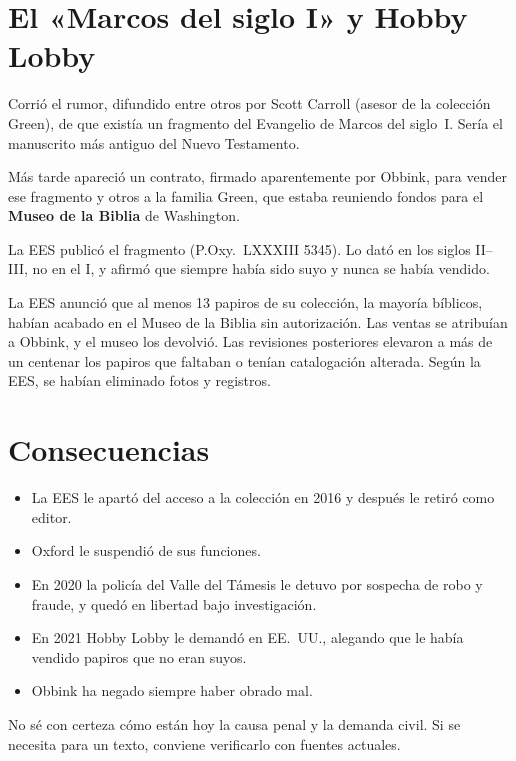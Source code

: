 \documentclass[11pt,a4paper]{article}
\begin{document}
\section*{El «Marcos del siglo I» y Hobby Lobby}

\begin{description}[nosep]
  \item[2012:] Corrió el rumor, difundido entre otros por Scott Carroll (asesor de la colección Green), de que existía un fragmento del Evangelio de Marcos del siglo~I. Sería el manuscrito más antiguo del Nuevo Testamento.
  \item[2013:] Más tarde apareció un contrato, firmado aparentemente por Obbink, para vender ese fragmento y otros a la familia Green, que estaba reuniendo fondos para el \textbf{Museo de la Biblia} de Washington.
  \item[2018:] La EES publicó el fragmento (P.Oxy.\ LXXXIII 5345). Lo dató en los siglos II--III, no en el I, y afirmó que siempre había sido suyo y nunca se había vendido.
  \item[2019:] La EES anunció que al menos 13 papiros de su colección, la mayoría bíblicos, habían acabado en el Museo de la Biblia sin autorización. Las ventas se atribuían a Obbink, y el museo los devolvió. Las revisiones posteriores elevaron a más de un centenar los papiros que faltaban o tenían catalogación alterada. Según la EES, se habían eliminado fotos y registros.
\end{description}

\section*{Consecuencias}

\begin{itemize}[nosep]
  \item La EES le apartó del acceso a la colección en 2016 y después le retiró como editor.
  \item Oxford le suspendió de sus funciones.
  \item En 2020 la policía del Valle del Támesis le detuvo por sospecha de robo y fraude, y quedó en libertad bajo investigación.
  \item En 2021 Hobby Lobby le demandó en EE.~UU., alegando que le había vendido papiros que no eran suyos.
  \item Obbink ha negado siempre haber obrado mal.
\end{itemize}

No sé con certeza cómo están hoy la causa penal y la demanda civil. Si se necesita para un texto, conviene verificarlo con fuentes actuales.
\end{document}
